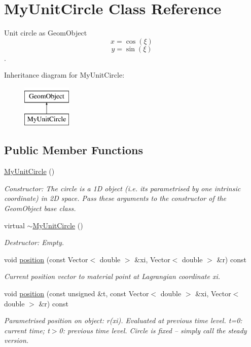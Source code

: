 \hypertarget{classMyUnitCircle}{}\section{My\+Unit\+Circle Class Reference}
\label{classMyUnitCircle}


Unit circle as Geom\+Object \[ x = \cos(\xi) \] \[ y = \sin(\xi) \].  


Inheritance diagram for My\+Unit\+Circle\+:\begin{figure}[H]
\begin{center}
\leavevmode
\includegraphics[height=2.000000cm]{classMyUnitCircle}
\end{center}
\end{figure}
\subsection*{Public Member Functions}
\begin{DoxyCompactItemize}
\item 
\hyperlink{classMyUnitCircle_a056add64776e52a8ea2ba2e9d6d0e32d}{My\+Unit\+Circle} ()
\begin{DoxyCompactList}\small\item\em Constructor\+: The circle is a 1D object (i.\+e. it\textquotesingle{}s parametrised by one intrinsic coordinate) in 2D space. Pass these arguments to the constructor of the Geom\+Object base class. \end{DoxyCompactList}\item 
virtual \hyperlink{classMyUnitCircle_ae6b321a25ef6f6b12d7c9a225f91140d}{$\sim$\+My\+Unit\+Circle} ()
\begin{DoxyCompactList}\small\item\em Destructor\+: Empty. \end{DoxyCompactList}\item 
void \hyperlink{classMyUnitCircle_ab60b73d1c28b013c40dd2aaa98072261}{position} (const Vector$<$ double $>$ \&xi, Vector$<$ double $>$ \&r) const
\begin{DoxyCompactList}\small\item\em Current position vector to material point at Lagrangian coordinate xi. \end{DoxyCompactList}\item 
void \hyperlink{classMyUnitCircle_a6a38e6320399940db4c9858668189ec3}{position} (const unsigned \&t, const Vector$<$ double $>$ \&xi, Vector$<$ double $>$ \&r) const
\begin{DoxyCompactList}\small\item\em Parametrised position on object\+: r(xi). Evaluated at previous time level. t=0\+: current time; t$>$0\+: previous time level. Circle is fixed -- simply call the steady version. \end{DoxyCompactList}\end{DoxyCompactItemize}


